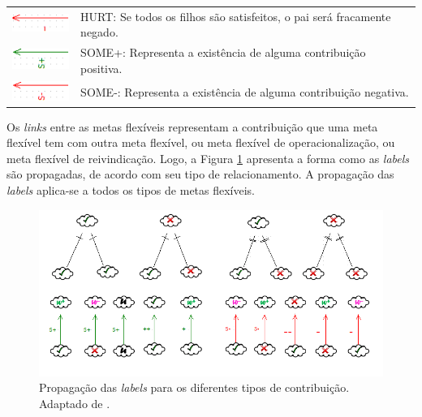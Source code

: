 \begin{table}[h!]
\begin{tabular}{@{}cl@{}}
		\multirow{2}{*}{\includegraphics[scale=0.9]{figuras/Hurt.png}} & \multirow{2}{*}{HURT: Se todos os filhos são satisfeitos, o pai será fracamente negado.} \\
		&  \\ \hline
		\multirow{2}{*}{\includegraphics[scale=0.9]{figuras/SomeMais.png}} & \multirow{2}{*}{SOME+: Representa a existência de alguma contribuição positiva.} \\
		&  \\ \hline
		\multirow{2}{*}{\includegraphics[scale=0.9]{figuras/SomeMenos.png}} & \multirow{2}{*}{SOME-: Representa a existência de alguma contribuição negativa.} \\
		&  \\ \hline
	\end{tabular}
\end{table}

\pagebreak

Os \textit{links} entre as metas flexíveis representam a contribuição que uma meta flexível tem com outra meta flexível, ou meta flexível de operacionalização, ou meta flexível de reivindicação. Logo, a Figura \ref{catalogoDeAvaliação} apresenta a forma como as \textit{labels} são propagadas, de acordo com seu tipo de relacionamento. A propagação das \textit{labels} aplica-se a todos os tipos de metas flexíveis. 

\begin{figure}[h!]
	\centering
	\includegraphics[keepaspectratio=true,scale=0.8]{figuras/catalogoDeAvaliacao.png}
	\caption{Propagação das \textit{labels} para os diferentes tipos de contribuição. Adaptado de \cite{chung2012non}.}
	\label{catalogoDeAvaliação}
\end{figure} 

